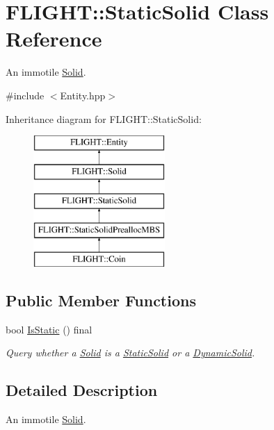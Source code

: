 \hypertarget{class_f_l_i_g_h_t_1_1_static_solid}{}\section{F\+L\+I\+G\+HT\+:\+:Static\+Solid Class Reference}
\label{class_f_l_i_g_h_t_1_1_static_solid}


An immotile \hyperlink{class_f_l_i_g_h_t_1_1_solid}{Solid}.  




{\ttfamily \#include $<$Entity.\+hpp$>$}

Inheritance diagram for F\+L\+I\+G\+HT\+:\+:Static\+Solid\+:\begin{figure}[H]
\begin{center}
\leavevmode
\includegraphics[height=5.000000cm]{class_f_l_i_g_h_t_1_1_static_solid}
\end{center}
\end{figure}
\subsection*{Public Member Functions}
\begin{DoxyCompactItemize}
\item 
bool \hyperlink{class_f_l_i_g_h_t_1_1_static_solid_ae810b48d76acce73364e6b714a77f4cd}{Is\+Static} () final
\begin{DoxyCompactList}\small\item\em Query whether a \hyperlink{class_f_l_i_g_h_t_1_1_solid}{Solid} is a \hyperlink{class_f_l_i_g_h_t_1_1_static_solid}{Static\+Solid} or a \hyperlink{class_f_l_i_g_h_t_1_1_dynamic_solid}{Dynamic\+Solid}. \end{DoxyCompactList}\end{DoxyCompactItemize}


\subsection{Detailed Description}
An immotile \hyperlink{class_f_l_i_g_h_t_1_1_solid}{Solid}. 

